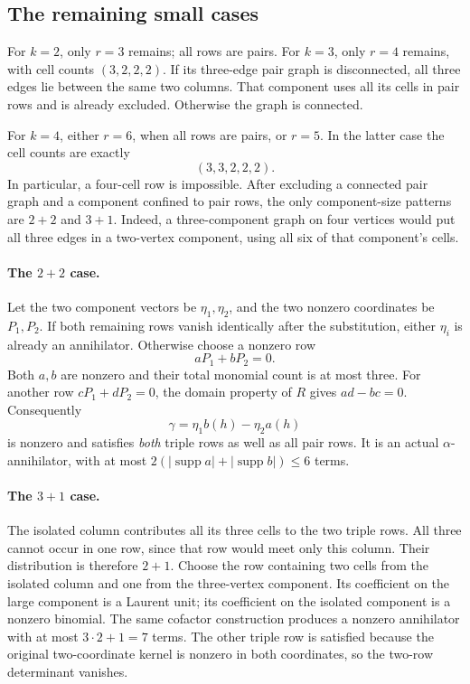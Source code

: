 \documentclass[11pt,a4paper,oneside]{report}
\theoremstyle{definition}
\theoremstyle{remark}
\DeclareMathOperator{\supp}{supp}
\begin{document}
\subsection{The remaining small cases}
For $k=2$, only $r=3$ remains; all rows are pairs. For $k=3$,
only $r=4$ remains, with cell counts $(3,2,2,2)$. If its three-edge
pair graph is disconnected, all three edges lie between the same
two columns. That component uses all its cells in pair rows and
is already excluded. Otherwise the graph is connected.

For $k=4$, either $r=6$, when all rows are pairs, or $r=5$.
In the latter case the cell counts are exactly
\begin{equation}\label{M09:eq:shape}
(3,3,2,2,2).
\end{equation}
In particular, a four-cell row is impossible. After excluding a
connected pair graph and a component confined to pair rows, the
only component-size patterns are $2+2$ and $3+1$. Indeed, a
three-component graph on four vertices would put all three edges
in a two-vertex component, using all six of that component's cells.

\paragraph{The $2+2$ case.}
Let the two component vectors be $\eta_1,\eta_2$, and the two
nonzero coordinates be $P_1,P_2$. If both remaining rows vanish
identically after the substitution, either $\eta_i$ is already
an annihilator. Otherwise choose a nonzero row
\[
aP_1+bP_2=0.
\]
Both $a,b$ are nonzero and their total monomial count is at most
three. For another row $cP_1+dP_2=0$, the domain property of $R$
gives $ad-bc=0$. Consequently
\[
\gamma=\eta_1b(h)-\eta_2a(h)
\]
is nonzero and satisfies \emph{both} triple rows as well as all
pair rows. It is an actual $\alpha$-annihilator, with at most
$2(|\supp a|+|\supp b|)\le6$ terms.

\paragraph{The $3+1$ case.}
The isolated column contributes all its three cells to the two
triple rows. All three cannot occur in one row, since that row
would meet only this column. Their distribution is therefore
$2+1$. Choose the row containing two cells from the isolated
column and one from the three-vertex component. Its coefficient
on the large component is a Laurent unit; its coefficient on the
isolated component is a nonzero binomial. The same cofactor
construction produces a nonzero annihilator with at most
$3\cdot2+1=7$ terms. The other triple row is satisfied because
the original two-coordinate kernel is nonzero in both coordinates,
so the two-row determinant vanishes.
\end{document}
